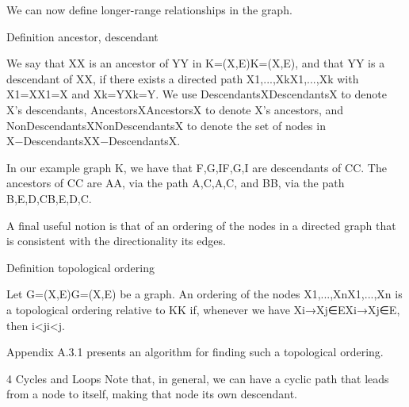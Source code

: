 We can now define longer-range relationships in the graph.

Definition ancestor, descendant

We say that XX is an ancestor of YY in K=(X,E)K=(X,E), and that YY is a descendant of XX, if there exists a directed path X1,...,XkX1,...,Xk with X1=XX1=X and Xk=YXk=Y. We use DescendantsXDescendantsX to denote X’s descendants, AncestorsXAncestorsX to denote X’s ancestors, and NonDescendantsXNonDescendantsX to denote the set of nodes in X−DescendantsXX−DescendantsX.

In our example graph K, we have that F,G,IF,G,I are descendants of CC. The ancestors of CC are AA, via the path A,C,A,C, and BB, via the path B,E,D,CB,E,D,C.

A final useful notion is that of an ordering of the nodes in a directed graph that is consistent with the directionality its edges.

Definition topological ordering

Let G=(X,E)G=(X,E) be a graph. An ordering of the nodes X1,...,XnX1,...,Xn is a topological ordering relative to KK if, whenever we have Xi→Xj∈EXi→Xj∈E, then i<ji<j.

Appendix A.3.1 presents an algorithm for finding such a topological ordering.

4 Cycles and Loops
Note that, in general, we can have a cyclic path that leads from a node to itself, making that node its own descendant.

